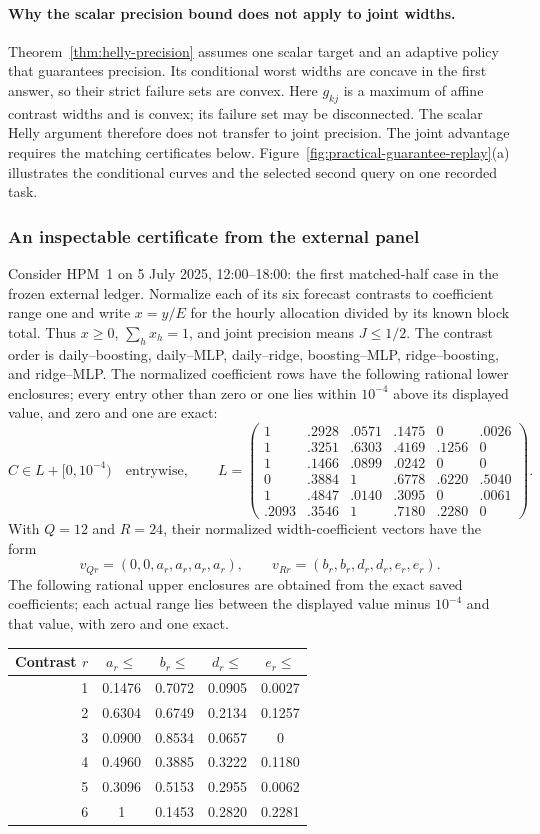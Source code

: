 \documentclass[12pt]{article}
\begin{document}
\paragraph{Why the scalar precision bound does not apply to joint widths.}
Theorem~\ref{thm:helly-precision} assumes one scalar target and an adaptive
policy that guarantees precision. Its conditional worst widths are concave
in the first answer, so their strict failure sets are convex. Here $g_{kj}$
is a maximum of affine contrast widths and is convex; its failure set may
be disconnected. The scalar Helly argument therefore does not transfer to
joint precision. The joint advantage requires the matching certificates
below. Figure~\ref{fig:practical-guarantee-replay}(a) illustrates the
conditional curves and the selected second query on one recorded task.
\subsubsection{An inspectable certificate from the external panel}
\label{sec:worked-joint-certificate}
Consider HPM~1 on 5 July 2025, 12:00--18:00: the first matched-half case
in the frozen external ledger.  Normalize each of its six forecast
contrasts to coefficient range one and write $x=y/E$ for the hourly
allocation divided by its known block total. Thus $x\geq0$, $\sum_hx_h=1$,
and joint precision means $J\leq1/2$. The contrast order is
daily--boosting, daily--MLP, daily--ridge, boosting--MLP,
ridge--boosting, and ridge--MLP.  The normalized coefficient rows have
the following rational lower enclosures; every entry other than zero
or one lies within $10^{-4}$ above its displayed value, and zero and one
are exact:
\[
 C\in L+[0,10^{-4})\quad\text{entrywise},\qquad
 L=\begin{pmatrix}
 1&.2928&.0571&.1475&0&.0026\\
 1&.3251&.6303&.4169&.1256&0\\
 1&.1466&.0899&.0242&0&0\\
 0&.3884&1&.6778&.6220&.5040\\
 1&.4847&.0140&.3095&0&.0061\\
 .2093&.3546&1&.7180&.2280&0
 \end{pmatrix}.
\]
With $Q=12$ and $R=24$, their normalized width-coefficient
vectors have the form
\[
 v_{Qr}=(0,0,a_r,a_r,a_r,a_r),\qquad
 v_{Rr}=(b_r,b_r,d_r,d_r,e_r,e_r).
\]
The following rational upper enclosures are obtained from the exact saved
coefficients; each actual range lies between the displayed value minus
$10^{-4}$ and that value, with zero and one exact.
\begin{center}
\begin{tabular}{rcccc}
\toprule
Contrast $r$&$a_r\leq$&$b_r\leq$&$d_r\leq$&$e_r\leq$\\
\midrule
1&0.1476&0.7072&0.0905&0.0027\\
2&0.6304&0.6749&0.2134&0.1257\\
3&0.0900&0.8534&0.0657&0\\
4&0.4960&0.3885&0.3222&0.1180\\
5&0.3096&0.5153&0.2955&0.0062\\
6&1&0.1453&0.2820&0.2281\\
\bottomrule
\end{tabular}
\end{center}
\end{document}
